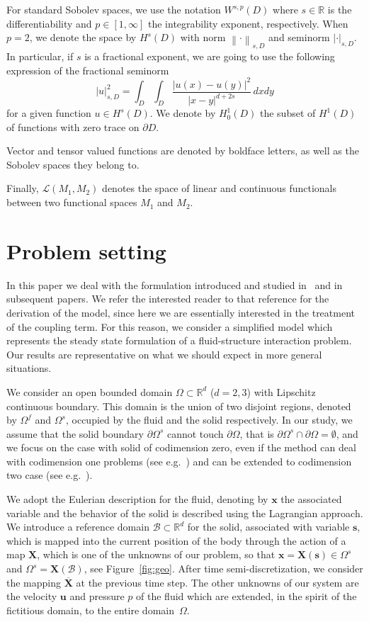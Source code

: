 \documentclass[oneside]{amsart} %
\newcommand{\numberset}{\mathbb}
\newcommand{\R}{\numberset{R}}
\newcommand{\norm}[1]{\left\lVert#1\right\rVert}
\newcommand{\abs}[1]{\left\lvert#1\right\rvert}
\newcommand\Of{\Omega^f} %
\newcommand\Os{\Omega^s} %
\newcommand\B{\mathcal B} %
\renewcommand\u{\mathbf{u}} %
\newcommand\x{\mathbf{x}} %
\newcommand\s{\mathbf{s}} %
\newcommand\X{\mathbf{X}} %
\newcommand\Xbar{\overline{\X}} %
\begin{document}
	For standard Sobolev spaces, we use the notation $W^{s,p}(D)$ where
	$s\in\R$ is the differentiability and $p\in[1,\infty]$ the integrability
	exponent, respectively. When $p=2$, we denote the space by $H^s(D)$ with norm
	$\norm{\cdot}_{s,D}$ and seminorm $\abs{\cdot}_{s,D}$. In particular, if $s$
	is a fractional exponent, we are going to use the following expression of
	the fractional seminorm
	\begin{equation*}
		\abs{u}_{s,D}^2 = \int_D \int_D \frac{\abs{u(x)-u(y)}^2}{\abs{x-y}^{d+2s}} \,dxdy
	\end{equation*}
	for a given function $u\in H^s(D)$.
	We denote by $H^1_0(D)$ the subset of $H^1(D)$ of functions with zero trace on $\partial D$.
	
	Vector and tensor valued functions are denoted by boldface letters, as well as the Sobolev spaces they belong to.
	
	Finally, $\mathscr{L}(M_1,M_2)$ denotes the space of linear and continuous functionals between two functional spaces $M_1$ and $M_2$. 
	
	\section{Problem setting}\label{sec:problem_setting}
	
	In this paper we deal with the formulation introduced and studied
	in~\cite{2015,stat} and in subsequent papers. We refer the interested reader to
	that reference for the derivation of the model, since here we are essentially
	interested in the treatment of the coupling term. For this reason, we
	consider a simplified model which represents the steady state formulation
	of a fluid-structure interaction problem. Our results are representative on what we should expect in more general situations.
	
	We consider an open bounded domain $\Omega\subset\R^d$ ($d=2,3$) with
	Lipschitz continuous boundary. This domain is the union of two disjoint
	regions, denoted by $\Of$ and $\Os$, occupied by the fluid and the solid
	respectively. In our study, we assume that the solid boundary $\partial\Os$
	cannot touch $\partial\Omega$, that is
	$\partial\Os\cap\partial\Omega=\emptyset$, and we focus on the case with solid
	of codimension zero, even if the method can deal with codimension one problems
	(see e.g.~\cite{2015,annese}) and can be extended to codimension two case
	(see e.g.~\cite{ALZETTA,heltaizunino}).
	
	We adopt the Eulerian description for the fluid, denoting by $\x$ the
	associated variable and the behavior of the solid is described using the
	Lagrangian approach. We introduce a reference domain $\B\subset\R^d$ for the
	solid, associated with variable $\s$, which is mapped into the current
	position of the body through the action of a map $\X$, which is one of the
	unknowns of our problem, so that $\x=\X(\s)\in\Os$ and $\Os=\X(\B)$, see
	Figure~\ref{fig:geo}.
	After time semi-discretization, we consider the mapping $\Xbar$ at the
	previous time step.
	The other unknowns of our system are the velocity $\u$ and pressure $p$ of the fluid which are extended, in the spirit of the fictitious domain, to
	the entire domain~$\Omega$.
	
\end{document}
